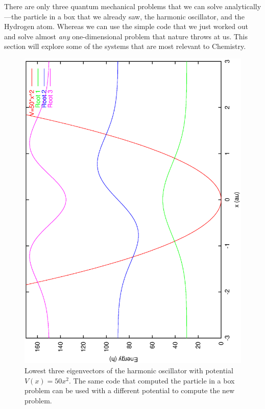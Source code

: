 There are only three quantum mechanical problems that we can solve
analytically---the particle in a box that we already saw, the harmonic
oscillator, and the Hydrogen atom. Whereas we can use the simple code
that we just worked out and solve almost \emph{any} one-dimensional
problem that nature throws at us. This section will explore some of
the systems that are most relevant to Chemistry.

\begin{figure}
\begin{center}
\includegraphics[scale=0.5,angle=270]{harmonic.eps}
\end{center}
\caption{Lowest three eigenvectors of the harmonic oscillator with
potential $V(x)=50x^2$. The same code that computed the particle in a
box problem can be used with a different potential to compute the new
problem.}
\label{harmonic-plot}
\end{figure}

